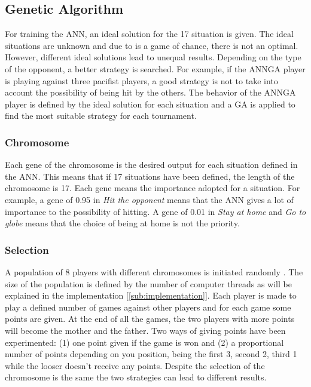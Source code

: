 	\subsection{Genetic Algorithm} %
	\label{sub:genetic_algorithm}
	For training the ANN, an ideal solution for the 17 situation is given.
	The ideal situations are unknown and due to is a game of chance, there is not an optimal.
	However, different ideal solutions lead to unequal results.
	Depending on the type of the opponent, a better strategy is searched.
	For example, if the ANNGA player is playing against three pacifist players, a good strategy is not to take into account the possibility of being hit by the others. 
	The behavior of the ANNGA player is defined by the ideal solution for each situation and a GA is applied to find the most suitable strategy for each tournament.
		\subsubsection{Chromosome} %
		\label{ssub:chromosome}
		Each gene of the chromosome is the desired output for each situation defined in the ANN.
		This means that if 17 situations have been defined, the length of the chromosome is 17.
		Each gene means the importance adopted for a situation. 
		For example, a gene of 0.95 in \emph{Hit the opponent} means that the ANN gives a lot of importance to the possibility of hitting.
		A gene of 0.01 in \emph{Stay at home} and \emph{Go to globe} means that the choice of being at home is not the priority.

		\subsubsection{Selection} %
		\label{ssub:selection}
		A population of 8 players with different chromosomes is initiated randomly \cite{koh}. 
		The size of the population is defined by the number of computer threads as will be explained in the implementation [\ref{sub:implementation}].
		Each player is made to play a defined number of games against other players and for each game some points are given.
		At the end of all the games, the two players with more points will become the mother and the father.
		Two ways of giving points have been experimented: (1) one point given if the game is won and (2) a proportional number of points depending on you position, being the first 3, second 2, third 1 while the looser doesn't receive any points.
		Despite the selection of the chromosome is the same the two strategies can lead to different results.


